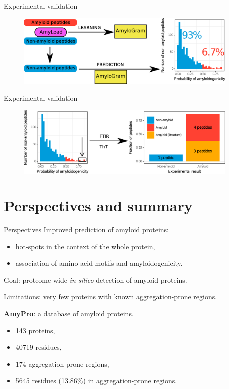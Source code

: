 \documentclass{beamer}\usepackage[]{graphicx}\usepackage[]{color}
\begin{document}
\begin{frame}{Experimental validation}
\begin{figure} 
\includegraphics[width=0.95\textwidth]{static_figure/diagram1.eps}
\end{figure}
\end{frame}

\begin{frame}{Experimental validation}
\begin{figure} 
\includegraphics[width=0.95\textwidth]{static_figure/diagram2.eps}
\end{figure}
\end{frame}


\section{Perspectives and summary}

\begin{frame}{Perspectives}
Improved prediction of amyloid proteins:
\begin{itemize}
\item hot-spots in the context of the whole protein,
\item association of amino acid motifs and amyloidogenicity.
\end{itemize}

Goal: proteome-wide \textit{in silico} detection of amyloid proteins.

Limitations: very few proteins with known aggregation-prone regions.

\textbf{AmyPro}: a database of amyloid proteins.

\begin{itemize}
 \item 143 proteins,
 \item 40719 residues,
 \item 174 aggregation-prone regions,
 \item 5645 residues (13.86\%) in aggregation-prone regions.
\end{itemize}

\end{frame}  
\end{document}
